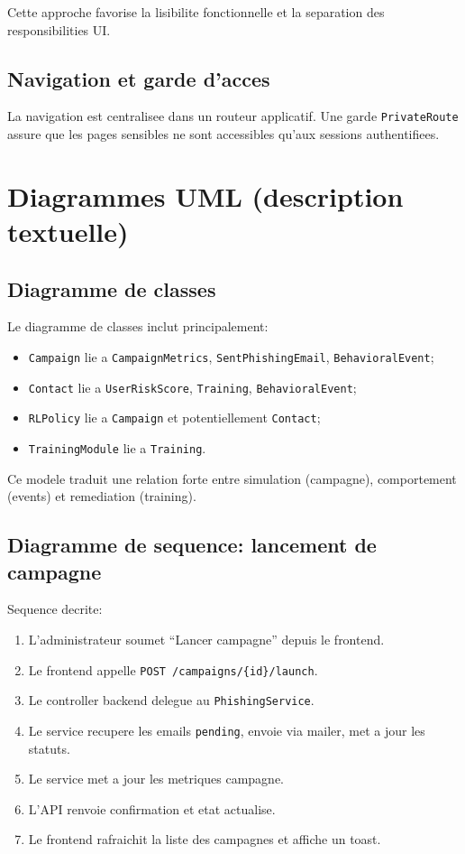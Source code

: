 \documentclass[12pt,a4paper,oneside]{report}
\begin{document}
Cette approche favorise la lisibilite fonctionnelle et la separation des responsibilities UI.

\subsection{Navigation et garde d'acces}
La navigation est centralisee dans un routeur applicatif. Une garde \texttt{PrivateRoute} assure que les pages sensibles ne sont accessibles qu'aux sessions authentifiees.

\section{Diagrammes UML (description textuelle)}
\subsection{Diagramme de classes}
Le diagramme de classes inclut principalement:
\begin{itemize}[leftmargin=1.2cm]
  \item \texttt{Campaign} lie a \texttt{CampaignMetrics}, \texttt{SentPhishingEmail}, \texttt{BehavioralEvent};
  \item \texttt{Contact} lie a \texttt{UserRiskScore}, \texttt{Training}, \texttt{BehavioralEvent};
  \item \texttt{RLPolicy} lie a \texttt{Campaign} et potentiellement \texttt{Contact};
  \item \texttt{TrainingModule} lie a \texttt{Training}.
\end{itemize}

Ce modele traduit une relation forte entre simulation (campagne), comportement (events) et remediation (training).

\subsection{Diagramme de sequence: lancement de campagne}
Sequence decrite:
\begin{enumerate}[leftmargin=1.2cm]
  \item L'administrateur soumet ``Lancer campagne'' depuis le frontend.
  \item Le frontend appelle \texttt{POST /campaigns/\{id\}/launch}.
  \item Le controller backend delegue au \texttt{PhishingService}.
  \item Le service recupere les emails \texttt{pending}, envoie via mailer, met a jour les statuts.
  \item Le service met a jour les metriques campagne.
  \item L'API renvoie confirmation et etat actualise.
  \item Le frontend rafraichit la liste des campagnes et affiche un toast.
\end{enumerate}
\end{document}
